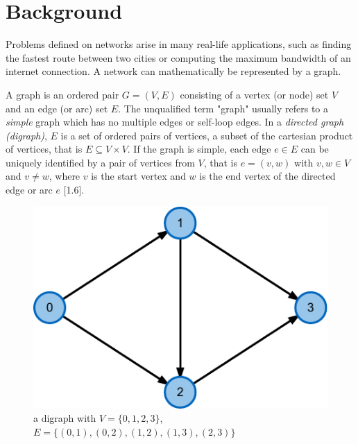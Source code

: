 \chapter{Background}\label{ch:2}
Problems defined on networks arise in many real-life applications, such as finding the fastest route between two cities or computing the maximum bandwidth of an internet connection. A network can mathematically be represented by a graph. 

\newcommand{\Ein}[1]{\delta^-(#1)}
\newcommand{\Eout}[1]{\delta^+(#1)}
\newcommand{\ein}{{e_{\text{in}}}}
\newcommand{\eout}{{e_{\text{out}}}}

\newcommand{\setfont}[1]{#1}

\begin{definition}
A graph is an ordered pair $G = (V, E)$ consisting of a vertex (or node) set $V$ and an edge (or arc) set $E$. The unqualified term "graph" usually refers to a \textit{simple} graph which has no multiple edges or self-loop edges. In a \textit{directed graph (digraph)}, $E$ is a set of ordered pairs of vertices, a subset of the cartesian product of vertices, that is $E \subseteq V \times V$. If the graph is simple, each edge $e \in E$ can be uniquely identified by a pair of vertices from $V$, that is $e=(v,w)$ with $v,w \in V$ and $v \neq w$, where $v$ is the start vertex and $w$ is the end vertex of the directed edge or arc $e$ \cite{jungnickel2013graphs}[1.6]. \end{definition}

\begin{figure}
\centering
	\includegraphics{fig/graph-editor}
	\caption{a digraph with $V=\{0,1,2,3\}$, $E=\{(0,1),(0,2),(1,2),(1,3),(2,3)\}$}
	\label{fig:graph}
\end{figure}

